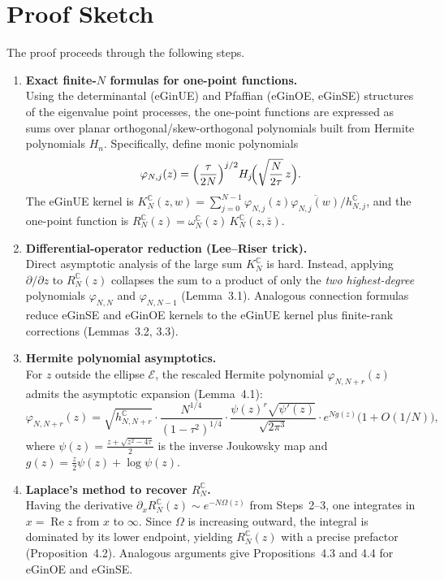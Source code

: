 \documentclass[11pt,a4paper]{article}
\theoremstyle{definition}
\theoremstyle{remark}
\begin{document}
\section{Proof Sketch}

The proof proceeds through the following steps.

\begin{enumerate}[label=\textbf{Step \arabic*.},leftmargin=2.5em]

\item \textbf{Exact finite-$N$ formulas for one-point functions.}\\
Using the determinantal (eGinUE) and Pfaffian (eGinOE, eGinSE) structures of the eigenvalue point processes, the one-point functions are expressed as sums over planar orthogonal/skew-orthogonal polynomials built from Hermite polynomials $H_n$.  Specifically, define monic polynomials
\[
\varphi_{N,j}(z)=\Bigl(\frac{\tau}{2N}\Bigr)^{j/2}H_j\!\Bigl(\sqrt{\frac{N}{2\tau}}\,z\Bigr).
\]
The eGinUE kernel is $K_N^{\mathbb{C}}(z,w)=\sum_{j=0}^{N-1}\varphi_{N,j}(z)\overline{\varphi_{N,j}(w)}/h_{N,j}^{\mathbb{C}}$, and the one-point function is $R_N^{\mathbb{C}}(z)=\omega_N^{\mathbb{C}}(z)\,K_N^{\mathbb{C}}(z,\bar z)$.

\item \textbf{Differential-operator reduction (Lee--Riser trick).}\\
Direct asymptotic analysis of the large sum $K_N^{\mathbb{C}}$ is hard.  Instead, applying $\partial/\partial z$ to $R_N^{\mathbb{C}}(z)$ collapses the sum to a product of only the \emph{two highest-degree} polynomials $\varphi_{N,N}$ and $\varphi_{N,N-1}$ (Lemma~3.1).  Analogous connection formulas reduce eGinSE and eGinOE kernels to the eGinUE kernel plus finite-rank corrections (Lemmas~3.2, 3.3).

\item \textbf{Hermite polynomial asymptotics.}\\
For $z$ outside the ellipse $\mathcal{E}$, the rescaled Hermite polynomial $\varphi_{N,N+r}(z)$ admits the asymptotic expansion (Lemma~4.1):
\[
\varphi_{N,N+r}(z)=\sqrt{h_{N,N+r}^{\mathbb{C}}}\cdot\frac{N^{1/4}}{(1-\tau^2)^{1/4}}\cdot\frac{\psi(z)^r\sqrt{\psi'(z)}}{\sqrt{2\pi^3}}\cdot e^{Ng(z)}\bigl(1+O(1/N)\bigr),
\]
where $\psi(z)=\tfrac{z+\sqrt{z^2-4\tau}}{2}$ is the inverse Joukowsky map and $g(z)=\tfrac{z}{2}\psi(z)+\log\psi(z)$.

\item \textbf{Laplace's method to recover $R_N^{\mathbb{C}}$.}\\
Having the derivative $\partial_x R_N^{\mathbb{C}}(z)\sim e^{-N\Omega(z)}$ from Steps~2--3, one integrates in $x=\operatorname{Re} z$ from $x$ to $\infty$.  Since $\Omega$ is increasing outward, the integral is dominated by its lower endpoint, yielding $R_N^{\mathbb{C}}(z)$ with a precise prefactor (Proposition~4.2).  Analogous arguments give Propositions~4.3 and 4.4 for eGinOE and eGinSE.


\end{enumerate}
\end{document}
